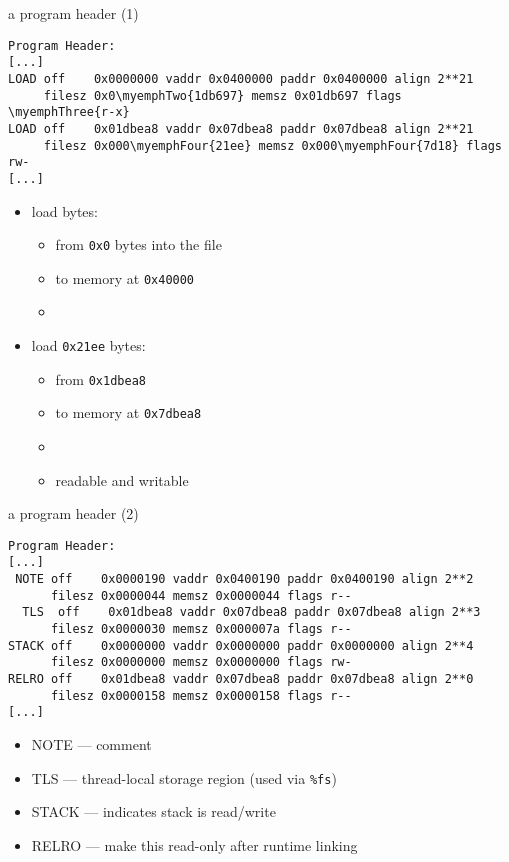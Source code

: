 \begin{frame}[fragile,label=elfExOver2]{a program header (1)}
\begin{Verbatim}[commandchars=\\\{\},fontsize=\fontsize{9}{10}\selectfont]
Program Header:
[...]
LOAD off    0x0000000 vaddr 0x0400000 paddr 0x0400000 align 2**21
     filesz 0x0\myemphTwo{1db697} memsz 0x01db697 flags \myemphThree{r-x}
LOAD off    0x01dbea8 vaddr 0x07dbea8 paddr 0x07dbea8 align 2**21
     filesz 0x000\myemphFour{21ee} memsz 0x000\myemphFour{7d18} flags rw-
[...]
\end{Verbatim}
\begin{itemize}
\item load {\tt {}} bytes:
        \begin{itemize}
        \item from {\tt 0x0} bytes into the file 
        \item to memory at {\tt 0x40000} \\
        \item {}
        \end{itemize}
\item load {\tt 0x21ee} bytes:
        \begin{itemize}
        \item from {\tt 0x1dbea8} 
        \item to memory at {\tt 0x7dbea8} 
        \item {}
        \item readable and writable
        \end{itemize}
\end{itemize}
\end{frame}

\begin{frame}[fragile,label=elfExOver3]{a program header (2)}
\begin{Verbatim}[commandchars=\\\{\},fontsize=\fontsize{9}{10}\selectfont]
Program Header:
[...]
 NOTE off    0x0000190 vaddr 0x0400190 paddr 0x0400190 align 2**2
      filesz 0x0000044 memsz 0x0000044 flags r--
  TLS  off    0x01dbea8 vaddr 0x07dbea8 paddr 0x07dbea8 align 2**3
      filesz 0x0000030 memsz 0x000007a flags r--
STACK off    0x0000000 vaddr 0x0000000 paddr 0x0000000 align 2**4
      filesz 0x0000000 memsz 0x0000000 flags rw-
RELRO off    0x01dbea8 vaddr 0x07dbea8 paddr 0x07dbea8 align 2**0
      filesz 0x0000158 memsz 0x0000158 flags r--
[...]
\end{Verbatim}
\begin{itemize}
\item NOTE --- comment
\item TLS --- thread-local storage region (used via {\tt \%fs})
\item STACK --- indicates stack is read/write
\item RELRO --- make this read-only after runtime linking
\end{itemize}
\end{frame}

